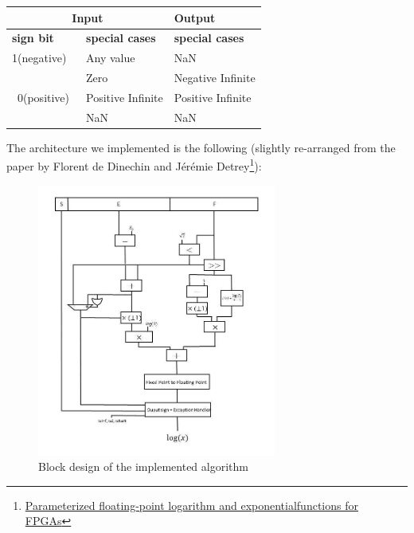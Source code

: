 \documentclass{report}
\begin{document}
\begin{table}[ht]
\centering
\begin{tabular}{|l|l|l|} 
\hline
\multicolumn{2}{|c|}{\textbf{Input}}                                          & \textbf{Output}         \\ 
\hline
\textbf{sign bit}               & \multicolumn{1}{|l|}{\textbf{special cases}} & \textbf{special cases}  \\ 
\hline
1(negative)                     & Any value                                   & NaN                     \\ 
\cline{1-1}
\multirow{4}{*}{~0(positive)~} & Zero                                        & Negative Infinite       \\
                                & Positive Infinite                           & Positive Infinite       \\
                                & NaN                                         & NaN                     \\
\hline
\end{tabular}
\end{table}
\newpage
The architecture we implemented is the following (slightly re-arranged from the paper by Florent de Dinechin and Jérémie Detrey\footnote{\href{https://hal-ens-lyon.archives-ouvertes.fr/ensl-00542213/file/DetreyDinechinJMM.pdf} {Parameterized floating-point logarithm and exponentialfunctions for FPGAs} }):
\begin{figure}[h]
  \centering
    \includegraphics[width=0.7\textwidth]{images/block_diagram.jpg}
    \caption{Block design of the implemented algorithm}
\end{figure}
\end{document}
